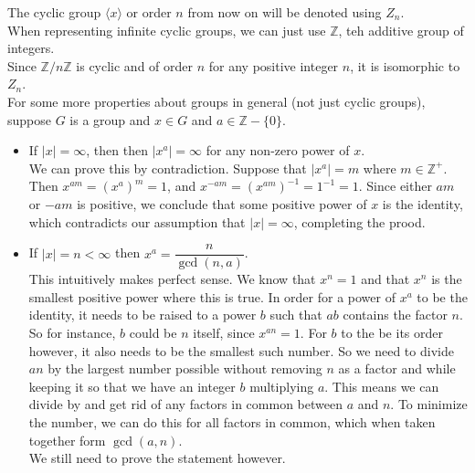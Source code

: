 \documentclass[12pt]{article}
\newcommand{\Z}{\mathbb{Z}}
\newcommand{\ang}[1]{\langle #1 \rangle}
\begin{document}
    The cyclic group $\ang{x}$ or order $n$
    from now on will be denoted using $Z_n$. \\
    When representing infinite cyclic groups,
    we can just use $\Z$, teh additive group of integers. \\

    Since $\Z/n\Z$ is cyclic and of order $n$
    for any positive integer $n$,
    it is isomorphic to $Z_n$. \\

    For some more properties about groups in general
    (not just cyclic groups),
    suppose $G$ is a group and $x \in G$ and $a \in \Z - \{0\}$.
    \begin{itemize}[label=$\diamond$]
        \item 
            If $|x| = \infty$, then 
            then $|x^a| = \infty$ for any non-zero power of $x$. \\
            We can prove this by contradiction.
            Suppose that $|x^a| = m$ where $m \in \Z^+$.
            Then $x^{am} = (x^a)^m = 1$,
            and $x^{-am} = (x^{am})^{-1} = 1^{-1} = 1$.
            Since either $am$ or $-am$ is positive,
            we conclude that some positive power of $x$
            is the identity,
            which contradicts our assumption that $|x| = \infty$,
            completing the prood.
        \item
            If $|x| = n < \infty$
            then $x^a = \dfrac{n}{\gcd(n, a)}$. \\
            This intuitively makes perfect sense.
            We know that $x^n = 1$ and that $x^n$
            is the smallest positive power where this is true.
            In order for a power of $x^a$ to be the identity,
            it needs to be raised to a power $b$
            such that $ab$ contains the factor $n$.
            So for instance, $b$ could be $n$ itself,
            since $x^{an} = 1$. 
            For $b$ to the be its order however,
            it also needs to be the smallest such number.
            So we need to divide $an$ by the largest
            number possible without removing $n$ as a factor
            and while keeping it so that we have
            an integer $b$ multiplying $a$.
            This means we can divide by and get rid of 
            any factors in common between $a$ and $n$.
            To minimize the number,
            we can do this for all factors in common,
            which when taken together form $\gcd(a, n)$. \\
            We still need to prove the statement however.

\end{itemize}
\end{document}
